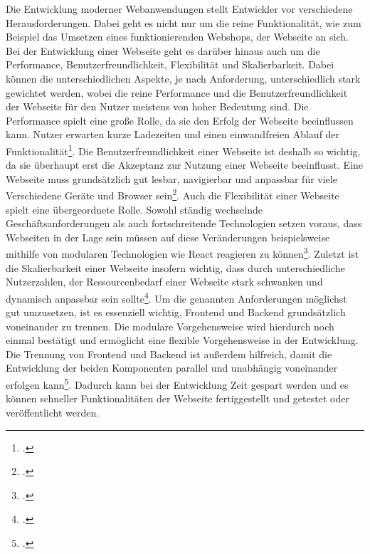 Die Entwicklung moderner Webanwendungen stellt Entwickler vor verschiedene Herausforderungen. Dabei geht es nicht nur um die reine Funktionalität, wie zum Beispiel das Umsetzen eines funktionierenden Webshops, der Webseite an sich. Bei der Entwicklung einer Webseite geht es darüber hinaus auch um die Performance, Benutzerfreundlichkeit, Flexibilität und Skalierbarkeit. Dabei können die unterschiedlichen Aspekte, je nach Anforderung, unterschiedlich stark gewichtet werden, wobei die reine Performance und die Benutzerfreundlichkeit der Webseite für den Nutzer meistens von hoher Bedeutung sind.
Die Performance spielt eine große Rolle, da sie den Erfolg der Webseite beeinflussen kann. Nutzer erwarten kurze Ladezeiten und einen einwandfreien Ablauf der Funktionalität\footcite{deinhard_uberblick_nodate}.
Die Benutzerfreundlichkeit einer Webseite ist deshalb so wichtig, da sie überhaupt erst die Akzeptanz zur Nutzung einer Webseite beeinflusst. Eine Webseite muss grundsätzlich gut lesbar, navigierbar und anpassbar für viele Verschiedene Geräte und Browser sein\footcite{autor_responsive_nodate}.
Auch die Flexibilität einer Webseite spielt eine übergeordnete Rolle. Sowohl ständig wechselnde Geschäftsanforderungen als auch fortschreitende Technologien setzen voraus, dass Webseiten in der Lage sein müssen auf diese Veränderungen beispielsweise mithilfe von modularen Technologien wie React reagieren zu können\footcite{autor_webentwicklung_nodate}.
Zuletzt ist die Skalierbarkeit einer Webseite insofern wichtig, dass durch unterschiedliche Nutzerzahlen, der Ressourcenbedarf einer Webseite stark schwanken und dynamisch anpassbar sein sollte\footcite{annacherniavska_erstellung_2023}.
Um die genannten Anforderungen möglichst gut umzusetzen, ist es essenziell wichtig, Frontend und Backend grundsätzlich voneinander zu trennen. Die modulare Vorgehensweise wird hierdurch noch einmal bestätigt und ermöglicht eine flexible Vorgehensweise in der Entwicklung. Die Trennung von Frontend und Backend ist außerdem hilfreich, damit die Entwicklung der beiden Komponenten parallel und unabhängig voneinander erfolgen kann\footcite{autor_warum_nodate}. Dadurch kann bei der Entwicklung Zeit gespart werden und es können schneller Funktionalitäten der Webseite fertiggestellt und getestet oder veröffentlicht werden.